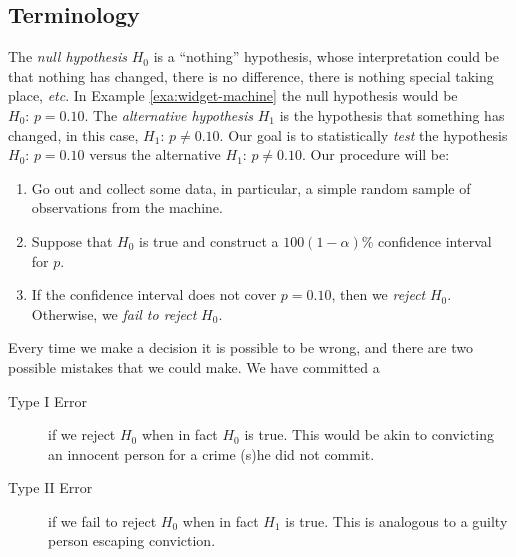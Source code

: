 \documentclass[captions=tableheading]{scrbook}
\begin{document}
\subsection{Terminology}
\label{sec-10-1-1}


The \emph{null hypothesis} \(H_{0}\) is a ``nothing'' hypothesis, whose interpretation could be that nothing has changed, there is no difference, there is nothing special taking place, \emph{etc}. In Example \ref{exa:widget-machine} the null hypothesis would be \(H_{0}:\, p=0.10.\) The \emph{alternative hypothesis} \(H_{1}\) is the hypothesis that something has changed, in this case, \(H_{1}:\, p\neq0.10\). Our goal is to statistically \emph{test} the hypothesis \(H_{0}:\, p=0.10\) versus the alternative \(H_{1}:\, p\neq0.10\). Our procedure will be:
\begin{enumerate}
\item Go out and collect some data, in particular, a simple random sample of observations from the machine.
\item Suppose that \(H_{0}\) is true and construct a \(100(1-\alpha)\%\) confidence interval for \(p\).
\item If the confidence interval does not cover \(p=0.10\), then we \emph{reject} \(H_{0}\). Otherwise, we \emph{fail to reject} \(H_{0}\).
\end{enumerate}

\begin{rem}
Every time we make a decision it is possible to be wrong, and there are two possible mistakes that we could make. We have committed a 
\begin{description}
\item[Type I Error] if we reject \(H_{0}\) when in fact \(H_{0}\) is true. This would be akin to convicting an innocent person for a crime (s)he did not commit.
\item[Type II Error] if we fail to reject \(H_{0}\) when in fact \(H_{1}\) is true. This is analogous to a guilty person escaping conviction.
\end{description}

\end{rem}
\end{document}
